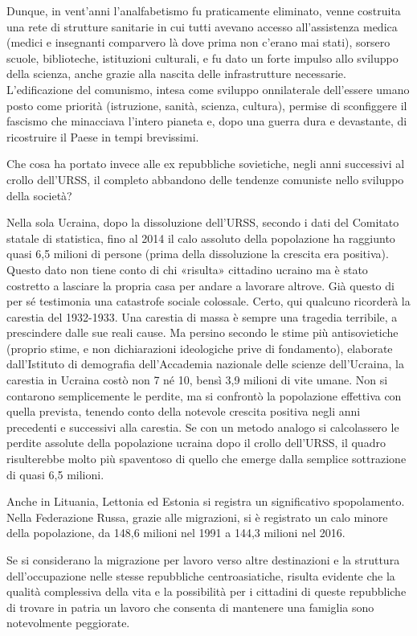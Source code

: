 \documentclass[../main]{subfiles}
\begin{document}
Dunque, in vent'anni l'analfabetismo fu praticamente eliminato, venne costruita una rete di strutture sanitarie in cui tutti avevano accesso all'assistenza medica (medici e insegnanti comparvero là dove prima non c'erano mai stati), sorsero scuole, biblioteche, istituzioni culturali, e fu dato un forte impulso allo sviluppo della scienza, anche grazie alla nascita delle infrastrutture necessarie. L'edificazione del comunismo, intesa come sviluppo onnilaterale dell'essere umano posto come priorità (istruzione, sanità, scienza, cultura), permise di sconfiggere il fascismo che minacciava l'intero pianeta e, dopo una guerra dura e devastante, di ricostruire il Paese in tempi brevissimi.

Che cosa ha portato invece alle ex repubbliche sovietiche, negli anni successivi al crollo dell'URSS, il completo abbandono delle tendenze comuniste nello sviluppo della società?

Nella sola Ucraina, dopo la dissoluzione dell'URSS, secondo i dati del Comitato statale di statistica, fino al 2014 il calo assoluto della popolazione ha raggiunto quasi 6,5 milioni di persone (prima della dissoluzione la crescita era positiva). Questo dato non tiene conto di chi «risulta» cittadino ucraino ma è stato costretto a lasciare la propria casa per andare a lavorare altrove. Già questo di per sé testimonia una catastrofe sociale colossale. Certo, qui qualcuno ricorderà la carestia del 1932-1933. Una carestia di massa è sempre una tragedia terribile, a prescindere dalle sue reali cause. Ma persino secondo le stime più antisovietiche (proprio stime, e non dichiarazioni ideologiche prive di fondamento), elaborate dall'Istituto di demografia dell'Accademia nazionale delle scienze dell'Ucraina, la carestia in Ucraina costò non 7 né 10, bensì 3,9 milioni di vite umane. Non si contarono semplicemente le perdite, ma si confrontò la popolazione effettiva con quella prevista, tenendo conto della notevole crescita positiva negli anni precedenti e successivi alla carestia. Se con un metodo analogo si calcolassero le perdite assolute della popolazione ucraina dopo il crollo dell'URSS, il quadro risulterebbe molto più spaventoso di quello che emerge dalla semplice sottrazione di quasi 6,5 milioni.

Anche in Lituania, Lettonia ed Estonia si registra un significativo spopolamento. Nella Federazione Russa, grazie alle migrazioni, si è registrato un calo minore della popolazione, da 148,6 milioni nel 1991 a 144,3 milioni nel 2016.

Se si considerano la migrazione per lavoro verso altre destinazioni e la struttura dell'occupazione nelle stesse repubbliche centroasiatiche, risulta evidente che la qualità complessiva della vita e la possibilità per i cittadini di queste repubbliche di trovare in patria un lavoro che consenta di mantenere una famiglia sono notevolmente peggiorate.
\end{document}
